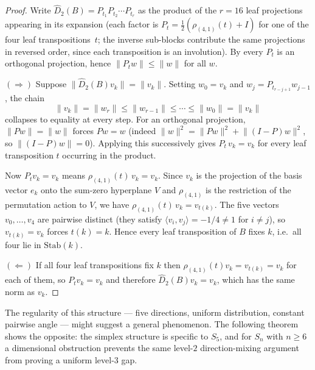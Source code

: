 \documentclass[version=final]{iacrcc}
\newcommand{\norm}[1]{\lVert #1 \rVert}
\newcommand{\Dhat}{\widehat{D}}
\begin{document}
\begin{proof}
Write $\Dhat_2(B) = P_{t_1} P_{t_2} \cdots P_{t_r}$ as the product of the
$r = 16$ leaf projections appearing in its expansion (each factor is
$P_t = \frac{1}{2}(\rho_{(4,1)}(t) + I)$ for one of the four leaf
transpositions~$t$; the inverse sub-blocks contribute the same projections in
reversed order, since each transposition is an involution). By
 every $P_t$ is an orthogonal projection, hence
$\norm{P_t w} \leq \norm{w}$ for all $w$.

$(\Rightarrow)$ Suppose $\norm{\Dhat_2(B)v_k} = \norm{v_k}$. Setting
$w_0 = v_k$ and $w_j = P_{t_{r-j+1}} w_{j-1}$, the chain
\[
\norm{v_k} = \norm{w_r} \leq \norm{w_{r-1}} \leq \cdots \leq \norm{w_0}
= \norm{v_k}
\]
collapses to equality at every step. For an orthogonal projection,
$\norm{P w} = \norm{w}$ forces $Pw = w$ (indeed
$\norm{w}^2 = \norm{Pw}^2 + \norm{(I-P)w}^2$, so $\norm{(I-P)w} = 0$).
Applying this successively gives $P_{t}\,v_k = v_k$ for every leaf
transposition $t$ occurring in the product.

Now $P_t v_k = v_k$ means $\rho_{(4,1)}(t)\,v_k = v_k$. Since $v_k$ is the
projection of the basis vector $e_k$ onto the sum-zero hyperplane $V$ and
$\rho_{(4,1)}$ is the restriction of the permutation action to $V$, we have
$\rho_{(4,1)}(t)\,v_k = v_{t(k)}$. The five vectors $v_0,\dots,v_4$ are
pairwise distinct (they satisfy $\langle v_i, v_j\rangle = -1/4 \neq 1$ for
$i \neq j$), so $v_{t(k)} = v_k$ forces $t(k) = k$. Hence every leaf
transposition of $B$ fixes $k$, i.e.\ all four lie in $\mathrm{Stab}(k)$.

$(\Leftarrow)$ If all four leaf transpositions fix $k$ then
$\rho_{(4,1)}(t) v_k = v_{t(k)} = v_k$ for each of them, so $P_t v_k = v_k$ and
therefore $\Dhat_2(B) v_k = v_k$, which has the same norm as $v_k$.
\end{proof}

The regularity of this structure --- five directions, uniform distribution,
constant pairwise angle --- might suggest a general phenomenon. The following
theorem shows the opposite: the simplex structure is specific to $S_5$, and
for $S_n$ with $n \geq 6$ a dimensional obstruction prevents the same
level-$2$ direction-mixing argument from proving a uniform level-$3$ gap.
\end{document}
